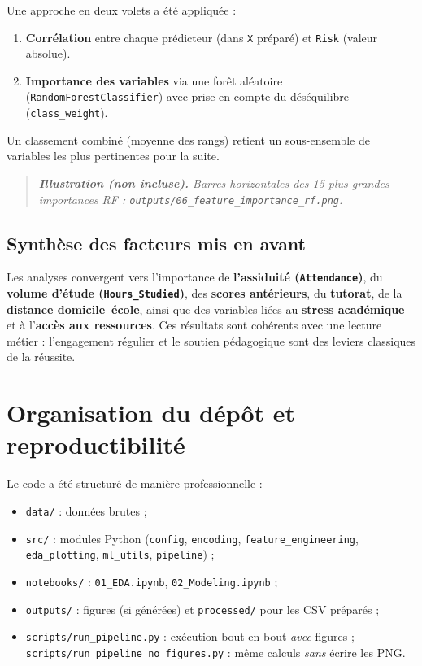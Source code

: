 \documentclass[a4paper,11pt]{article}
\newcommand{\notevisuel}[1]{%
  \begin{quote}\small\itshape
  \textbf{Illustration (non incluse).} #1
  \end{quote}
}
\begin{document}
Une approche en deux volets a été appliquée :
\begin{enumerate}[leftmargin=*]
  \item \textbf{Corrélation} entre chaque prédicteur (dans \texttt{X} préparé) et \texttt{Risk} (valeur absolue).
  \item \textbf{Importance des variables} via une forêt aléatoire (\texttt{RandomForestClassifier}) avec prise en compte du déséquilibre (\texttt{class\_weight}).
\end{enumerate}
Un classement combiné (moyenne des rangs) retient un sous-ensemble de variables les plus pertinentes pour la suite.

\notevisuel{Barres horizontales des 15 plus grandes importances RF : \texttt{outputs/06\_feature\_importance\_rf.png}.}

\subsection{Synthèse des facteurs mis en avant}
Les analyses convergent vers l'importance de \textbf{l'assiduité (\texttt{Attendance})}, du \textbf{volume d'étude (\texttt{Hours\_Studied})}, des \textbf{scores antérieurs}, du \textbf{tutorat}, de la \textbf{distance domicile--école}, ainsi que des variables liées au \textbf{stress académique} et à l'\textbf{accès aux ressources}. Ces résultats sont cohérents avec une lecture métier : l'engagement régulier et le soutien pédagogique sont des leviers classiques de la réussite.

\section{Organisation du dépôt et reproductibilité}

Le code a été structuré de manière professionnelle :
\begin{itemize}[leftmargin=*]
  \item \texttt{data/} : données brutes ;
  \item \texttt{src/} : modules Python (\texttt{config}, \texttt{encoding}, \texttt{feature\_engineering}, \texttt{eda\_plotting}, \texttt{ml\_utils}, \texttt{pipeline}) ;
  \item \texttt{notebooks/} : \texttt{01\_EDA.ipynb}, \texttt{02\_Modeling.ipynb} ;
  \item \texttt{outputs/} : figures (si générées) et \texttt{processed/} pour les CSV préparés ;
  \item \texttt{scripts/run\_pipeline.py} : exécution bout-en-bout \emph{avec} figures ; \texttt{scripts/run\_pipeline\_no\_figures.py} : même calculs \emph{sans} écrire les PNG.
\end{itemize}
\end{document}

